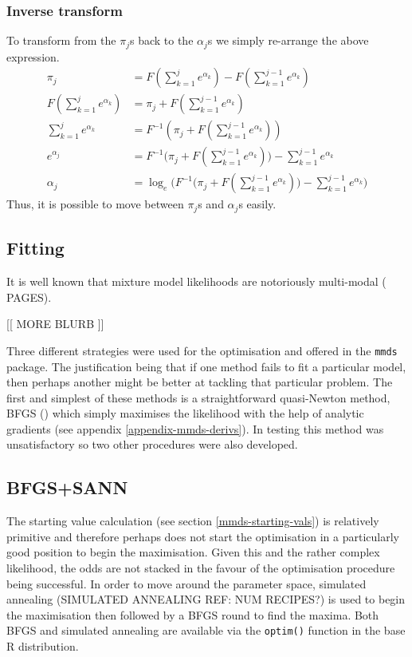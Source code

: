 \subsubsection{Inverse transform}
\label{mmds-pi-inv}
To transform from the $\pi_j$s back to the $\alpha_j$s we simply re-arrange the above expression.
\begin{align*}
\pi_j &= F(\sum_{k=1}^j e^{\alpha_k}) - F(\sum_{k=1}^{j-1} e^{\alpha_k})\\
F(\sum_{k=1}^j e^{\alpha_k}) &= \pi_j + F(\sum_{k=1}^{j-1} e^{\alpha_k})\\
\sum_{k=1}^j e^{\alpha_k} &= F^{-1}(\pi_j + F(\sum_{k=1}^{j-1} e^{\alpha_k}))\\
e^{\alpha_j} &= F^{-1}\Big(\pi_j + F(\sum_{k=1}^{j-1} e^{\alpha_k})\Big) - \sum_{k=1}^{j-1} e^{\alpha_k}\\
\alpha_j &= \log_e \Big(F^{-1}\Big(\pi_j + F(\sum_{k=1}^{j-1} e^{\alpha_k})\Big) - \sum_{k=1}^{j-1} e^{\alpha_k}\Big)
\end{align*}
Thus, it is possible to move between $\pi_j$s and $\alpha_j$s easily.

\subsection{Fitting}
It is well known that mixture model likelihoods are notoriously multi-modal (\cite{BDA} PAGES).

[[ MORE BLURB ]]

Three different strategies were used for the optimisation and offered in the \texttt{mmds} package. The justification being that if one method fails to fit a particular model, then perhaps another might be better at tackling that particular problem. The first and simplest of these methods is a straightforward quasi-Newton method, BFGS (\cite{bfgs}) which simply maximises the likelihood with the help of analytic gradients (see appendix \ref{appendix-mmds-derivs}). In testing this method was unsatisfactory so two other procedures were also developed.

\subsection{BFGS+SANN}
The starting value calculation (see section \ref{mmds-starting-vals}) is relatively primitive and therefore perhaps does not start the optimisation in a particularly good position to begin the maximisation. Given this and the rather complex likelihood, the odds are not stacked in the favour of the optimisation procedure being successful. In order to move around the parameter space, simulated annealing (SIMULATED ANNEALING REF: NUM RECIPES?) is used to begin the maximisation then followed by a BFGS round to find the maxima. Both BFGS and simulated annealing are available via the \texttt{optim()} function in the base \textsf{R} distribution.

